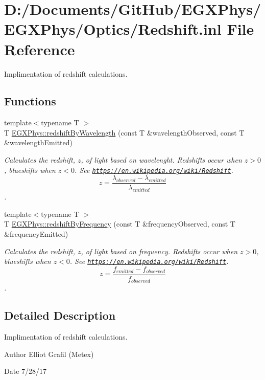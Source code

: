 \hypertarget{_redshift_8inl}{}\section{D\+:/\+Documents/\+Git\+Hub/\+E\+G\+X\+Phys/\+E\+G\+X\+Phys/\+Optics/\+Redshift.inl File Reference}
\label{_redshift_8inl}


Implimentation of redshift calculations.  


\subsection*{Functions}
\begin{DoxyCompactItemize}
\item 
{\footnotesize template$<$typename T $>$ }\\T \hyperlink{group___e_g_x_phys-_redshift_ga29300a13e34da35332ca2d447b5ce82d}{E\+G\+X\+Phys\+::redshift\+By\+Wavelength} (const T \&wavelength\+Observed, const T \&wavelength\+Emitted)
\begin{DoxyCompactList}\small\item\em Calculates the redshift, $z$, of light based on wavelenght. Redshifts occur when $z > 0$, blueshifts when $z < 0$. See \href{https://en.wikipedia.org/wiki/Redshift}{\tt https\+://en.\+wikipedia.\+org/wiki/\+Redshift}. \[z=\frac{\lambda_{observed}-\lambda_{emitted}}{\lambda_{emitted}}\]. \end{DoxyCompactList}\item 
{\footnotesize template$<$typename T $>$ }\\T \hyperlink{group___e_g_x_phys-_redshift_gacc6d3b2922061214d64b89a4b8e3967a}{E\+G\+X\+Phys\+::redshift\+By\+Frequency} (const T \&frequency\+Observed, const T \&frequency\+Emitted)
\begin{DoxyCompactList}\small\item\em Calculates the redshift, $z$, of light based on frequency. Redshifts occur when $z > 0$, blueshifts when $z < 0$. See \href{https://en.wikipedia.org/wiki/Redshift}{\tt https\+://en.\+wikipedia.\+org/wiki/\+Redshift}. \[z=\frac{f_{emitted}-f_{observed}}{f_{observed}}\]. \end{DoxyCompactList}\end{DoxyCompactItemize}


\subsection{Detailed Description}
Implimentation of redshift calculations. 

\begin{DoxyAuthor}{Author}
Elliot Grafil (Metex) 
\end{DoxyAuthor}
\begin{DoxyDate}{Date}
7/28/17 
\end{DoxyDate}
